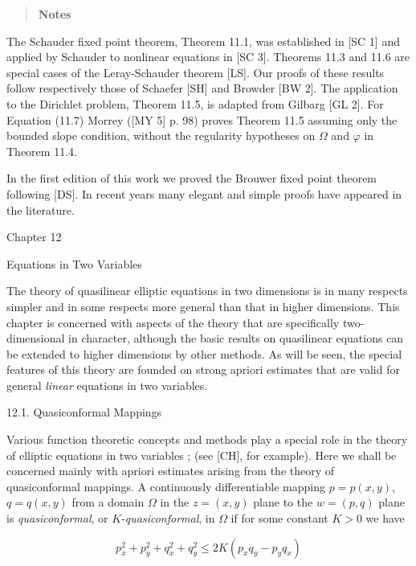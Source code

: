 
\begin{quote}
\textbf{Notes}
\end{quote}

The Schauder fixed point theorem, Theorem 11.1, was established in [SC 1] and applied by Schauder to nonlinear equations in [SC 3]. Theorems 11.3 and 11.6 are special cases of the Leray-Schauder theorem [LS]. Our proofs of these results follow respectively those of Schaefer [SH] and Browder [BW 2]. The application to the Dirichlet problem, Theorem 11.5, is adapted from Gilbarg [GL 2]. For Equation (11.7) Morrey ([MY 5] p. 98) proves Theorem 11.5 assuming only the bounded slope condition, without the regularity hypotheses on $\Omega$ and $\varphi$ in Theorem 11.4.

In the first edition of this work we proved the Brouwer fixed point theorem following [DS]. In recent years many elegant and simple proofs have appeared in the literature.


Chapter 12

Equations in Two Variables

The theory of quasilinear elliptic equations in two dimensions is in many respects simpler and in some respects more general than that in higher dimensions. This chapter is concerned with aspects of the theory that are specifically two-dimensional in character, although the basic results on quasilinear equations can be extended to higher dimensions by other methods. As will be seen, the special features of this theory are founded on strong apriori estimates that are valid for general \emph{linear} equations in two variables.

12.1. Quasiconformal Mappings

Various function theoretic concepts and methods play a special role in the theory of elliptic equations in two variables ; (see [CH], for example). Here we shall be concerned mainly with apriori estimates arising from the theory of quasiconformal mappings. A continuously differentiable mapping $p=p(x,y)$, $q=q(x,y)$ from a domain $\Omega$ in the $z=(x,y)$ plane to the $w=(p,q)$ plane is \emph{quasiconformal}, or $K$-\emph{quasiconformal}, in $\Omega$ if for some constant $K>0$ we have

\begin{equation}
p_x^2+p_y^2+q_x^2+q_y^2 \leq 2K(p_xq_y-p_yq_x)
\tag{12.1}
\end{equation}

